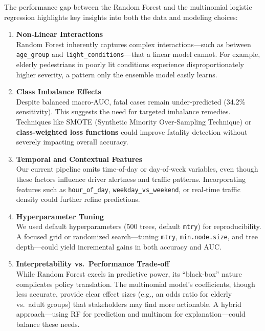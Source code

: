 \documentclass[
]{article}
\begin{document}
The performance gap between the Random Forest and the multinomial
logistic regression highlights key insights into both the data and
modeling choices:

\begin{enumerate}
\def\labelenumi{\arabic{enumi}.}
\item
  \textbf{Non‐Linear Interactions}\\
  Random Forest inherently captures complex interactions---such as
  between \texttt{age\_group} and \texttt{light\_conditions}---that a
  linear model cannot. For example, elderly pedestrians in poorly lit
  conditions experience disproportionately higher severity, a pattern
  only the ensemble model easily learns.
\item
  \textbf{Class Imbalance Effects}\\
  Despite balanced macro‐AUC, fatal cases remain under‐predicted (34.2\%
  sensitivity). This suggests the need for targeted imbalance remedies.
  Techniques like SMOTE (Synthetic Minority Over‐Sampling Technique) or
  \textbf{class‐weighted loss functions} could improve fatality
  detection without severely impacting overall accuracy.
\item
  \textbf{Temporal and Contextual Features}\\
  Our current pipeline omits time‐of‐day or day‐of‐week variables, even
  though these factors influence driver alertness and traffic patterns.
  Incorporating features such as \texttt{hour\_of\_day},
  \texttt{weekday\_vs\_weekend}, or real‐time traffic density could
  further refine predictions.
\item
  \textbf{Hyperparameter Tuning}\\
  We used default hyperparameters (500 trees, default \texttt{mtry}) for
  reproducibility. A focused grid or randomized search---tuning
  \texttt{mtry}, \texttt{min.node.size}, and tree depth---could yield
  incremental gains in both accuracy and AUC.
\item
  \textbf{Interpretability vs.~Performance Trade‑off}\\
  While Random Forest excels in predictive power, its ``black‑box''
  nature complicates policy translation. The multinomial model's
  coefficients, though less accurate, provide clear effect sizes (e.g.,
  an odds ratio for elderly vs.~adult groups) that stakeholders may find
  more actionable. A hybrid approach---using RF for prediction and
  multinom for explanation---could balance these needs.
\end{enumerate}
\end{document}
